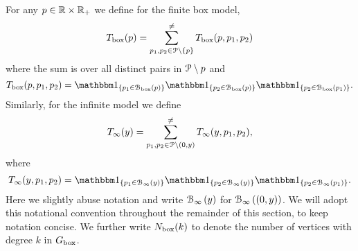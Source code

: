 %
%




For any $p \in {\ensuremath{\mathbb R}} \times {\ensuremath{\mathbb R}}_+$ we define for the finite box model,
\[
	T_{\text{box}}(p) = \sum^{\ne}_{p_1, p_2 \in {\mathcal P} \setminus \{p\}} T_{\text{box}}(p,p_1,p_2)
\]
where the sum is over all distinct pairs in ${\mathcal P} \setminus p$ and
\[
	T_{\text{box}}(p,p_1,p_2) = \ind{p_1 \in \BallPon{p}}\ind{p_2 \in \BallPon{p}}\ind{p_2 \in \BallPon{p_1}}.
\]
Similarly, for the infinite model we define
\[
	T_\infty(y) = \sum_{p_1, p_2 \in {\mathcal P} \setminus (0,y)}^{\ne} T_\infty(y,p_1,p_2),
\]
where
\[
	T_{\infty}(y,p_1,p_2) = \ind{p_1 \in \BallPo{y}}\ind{p_2 \in \BallPo{y}}\ind{p_2 \in \BallPo{p_1}}.
\]
Here we slightly abuse notation and write ${\mathcal B}_{\infty}\left(y\right)$ for ${\mathcal B}_{\infty}\left((0,y)\right)$. We will adopt this notational convention throughout the remainder of this section, to keep notation concise. We further write $N_{\text{box}}(k)$ to denote the number of vertices with degree $k$ in $G_{\mathrm{box}}$.

